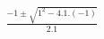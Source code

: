 \documentclass[preview]{standalone}
\begin{document}
\begin{align*}
\frac{-1 \pm \sqrt{1^2 - 4.1.(-1)}}{2.1}
\end{align*}
\end{document}
